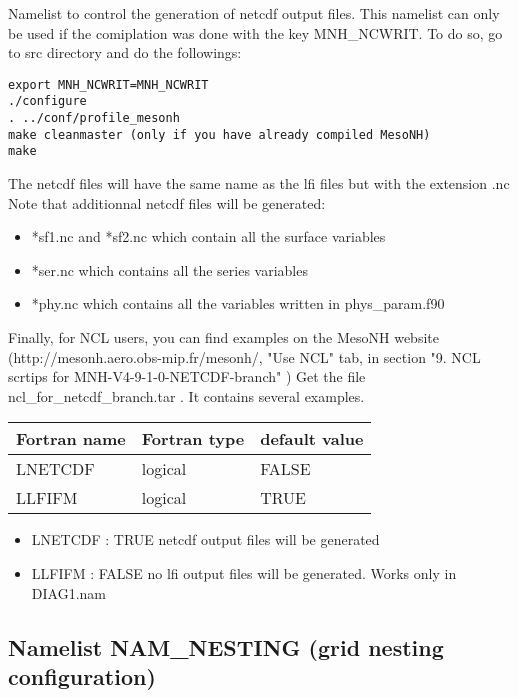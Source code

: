 Namelist to control the generation of netcdf output files.
This namelist can only be used if the comiplation was done with the key MNH\_NCWRIT. To do so, go to src directory and do the followings:
\begin{verbatim}
export MNH_NCWRIT=MNH_NCWRIT
./configure
. ../conf/profile_mesonh
make cleanmaster (only if you have already compiled MesoNH)
make
\end{verbatim}

The netcdf files will have the same name as the lfi files but with the extension .nc
Note that additionnal netcdf files will be generated:
\begin{itemize}
\item       *sf1.nc and *sf2.nc which contain all the surface variables
\item       *ser.nc  which contains all the series variables
\item       *phy.nc which contains all the variables written in phys\_param.f90
\end{itemize}
Finally, for NCL users, you can find examples on the MesoNH website
 (http://mesonh.aero.obs-mip.fr/mesonh/, "Use
NCL" tab,  in section "9. NCL scrtips for MNH-V4-9-1-0-NETCDF-branch" )
Get the file ncl\_for\_netcdf\_branch.tar . It contains several examples.


\begin{center}
\begin{tabular} {|l|l|l|}
\hline
Fortran name & Fortran type & default value \\
\hline
 LNETCDF & logical  &  FALSE  \\
 LLFIFM&  logical & TRUE \\
\hline
\end{tabular}
\end{center}


\begin{itemize}
\item
{} 
LNETCDF : TRUE  netcdf output files will be generated
\item
{} 
LLFIFM      : FALSE  no lfi output files will be generated. Works only in DIAG1.nam 
\end{itemize}

\subsection{Namelist NAM\_NESTING (grid nesting configuration)}

